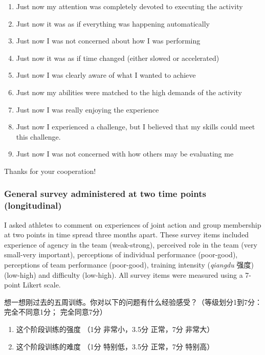 \begin{CJK}{UTF8}{gbsn}
    \begin{enumerate}
      \item Just now my attention was completely devoted to executing the activity
      \item Just now it was as if everything was happening automatically
      \item Just now I was not concerned about how I was performing
      \item Just now it was as if time changed (either slowed or accelerated)
      \item Just now I was clearly aware of what I wanted to achieve
      \item Just now my abilities were matched to the high demands of the activity
      \item Just now I was really enjoying the experience
      \item Just now I experienced a challenge, but I believed that my skills could meet this challenge.
      \item Just now I was not concerned with how others may be evaluating me
    \end{enumerate}

    Thanks for your cooperation!



  \subsubsection{General survey administered at two time points (longitudinal)}
    I asked athletes to comment on experiences of joint action and group membership at two points in time spread three months apart.  These survey items included experience of agency in the team (weak-strong), perceived role in the team (very small-very important), perceptions of individual performance (poor-good), perceptions of team performance (poor-good), training intensity (\textit{qiangdu} 强度) (low-high) and difficulty (low-high).  All survey items were measured using a 7-point Likert scale.



    想一想刚过去的五周训练。你对以下的问题有什么经验感受？（等级划分1到7分：完全不同意1分； 完全同意7分）
    \begin{enumerate}
    \item 这个阶段训练的强度 （1分 非常小，3.5分 正常，7分 非常大）
    \item 这个阶段训练的难度 （1分 特别低，3.5分 正常，7分 特别高）
    \end{enumerate}


\end{CJK}
